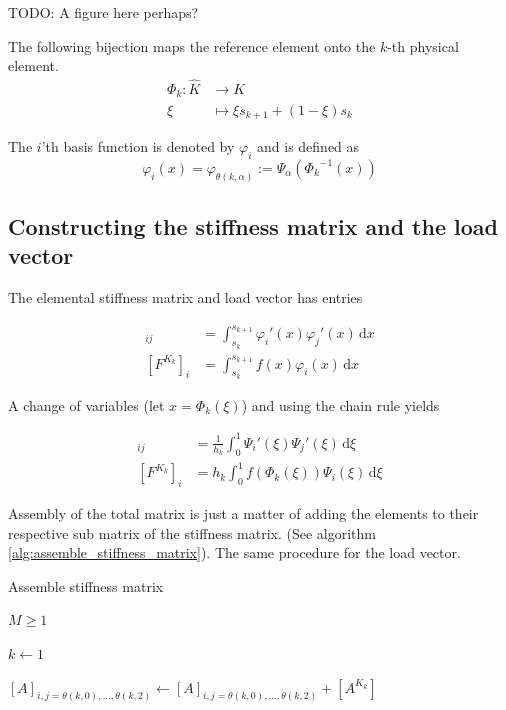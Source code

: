 TODO: A figure here perhaps?

The following bijection maps the reference element onto
the \( k \)-th physical element.
\begin{align}
  \Phi_k : \hat{K} &\longrightarrow  K \\
  \xi & \longmapsto \xi s_{k+1} + (1-\xi) s_{k}
\end{align}

The \( i \)'th basis function is denoted by \( \varphi_i \)
and is defined as
\begin{equation}
  \varphi_i(x) = \varphi_{\theta(k, \alpha)} := \Psi_{\alpha}({{\Phi_k}^{-1}(x) })
\end{equation}

\subsection{Constructing the stiffness matrix and the load vector}

The elemental stiffness matrix and load vector has entries

\begin{align}
  [A^{K_k}]_{ij}
    &=  \int_{s_k}^{s_{k+1}} \varphi_i'(x) \varphi_j'(x) \,\mathrm{d}x\\
  [F^{K_k}]_i
    &= \int_{s_k}^{s_{k+1}} f\left(x\right) \varphi_i\left(x\right) \,\mathrm{d}x
\end{align}

A change of variables (let \( x = \Phi_k(\xi) \)) and using the chain rule yields

\begin{align}
  [A^{K_k}]_{ij}
    &= \frac{1}{h_k} \int_{0}^{1} \Psi_i'(\xi)\Psi_j'(\xi) \,\mathrm{d}\xi \\
  [F^{K_k}]_i
    &= h_k \int_{0}^{1} f\left(\Phi_k\left(\xi\right)\right) \Psi_i\left(\xi\right) \,\mathrm{d}\xi
\end{align}

Assembly of the total matrix is just a matter of
adding the elements to their respective sub matrix
of the stiffness matrix. (See algorithm \ref{alg:assemble_stiffness_matrix}).
The same procedure for the load vector.

\begin{algorithm}
\caption{Assemble stiffness matrix}\label{alg:assemble_stiffness_matrix}
\begin{algorithmic}
\Require $M \geq 1$

\State $k \gets 1$

\State $[A]_{i, j=\theta(k, 0), \dots, \theta(k, 2)}
\gets [A]_{i, j=\theta(k, 0), \dots, \theta(k, 2)} + [A^{K_k}]$
\EndFor


\end{algorithmic}
\end{algorithm}

